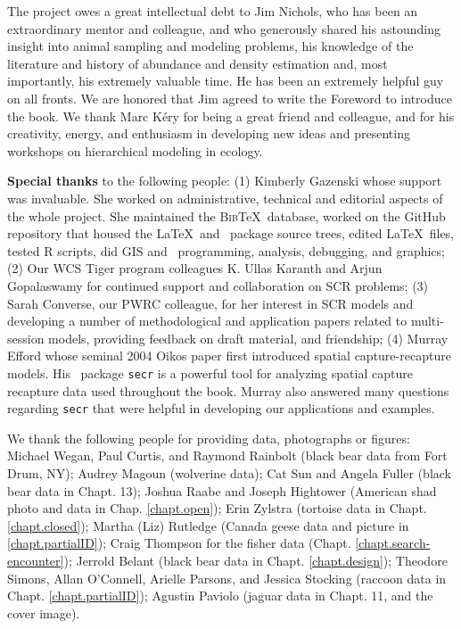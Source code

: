 
The project owes a great intellectual debt to Jim Nichols, who has
been an extraordinary mentor and colleague,
and who generously shared his
astounding insight into animal sampling and modeling problems, his
knowledge
of the literature and history of abundance and density estimation
and, most importantly, his extremely valuable time.
He has
been
an %
extremely helpful guy on all fronts. We are honored that Jim
agreed to write the Foreword to introduce the book. 
 We thank Marc K\'{e}ry
for being a great friend and colleague, and for his creativity, 
energy, and enthusiasm in developing new ideas and
presenting workshops on hierarchical modeling in ecology.

{\bf Special thanks} to the following people: (1) Kimberly Gazenski whose support was
invaluable. She worked on administrative, technical and editorial
aspects of the whole project. She maintained the \textsc{Bib}\TeX~database,
worked on the GitHub repository that housed the \LaTeX~and \R~package
source trees, edited \LaTeX~files, tested R scripts, did GIS and
\R~programming, analysis, debugging, and graphics;  (2) Our WCS Tiger
program colleagues K. Ullas Karanth and Arjun Gopalaswamy for
continued support and collaboration on SCR problems;  (3) Sarah
Converse, our PWRC colleague, for her interest in SCR models and
developing a number of methodological and application papers related
to multi-session models, providing feedback on draft material, and
friendship;  (4) Murray Efford whose seminal 2004 Oikos paper first introduced spatial
capture-recapture models.  His \R~package \mbox{\tt secr} 
is a powerful tool for analyzing
spatial capture recapture data used
throughout the book. Murray also answered many questions regarding \mbox{\tt secr} that 
were helpful in developing our applications and examples.

We thank the following people for providing data, photographs or figures:
Michael Wegan, Paul Curtis, and Raymond Rainbolt (black bear data from Fort Drum, NY);
Audrey Magoun (wolverine data); Cat Sun and Angela Fuller (black bear
data in Chapt. 13); Joshua Raabe and Joseph Hightower (American shad
photo and data in Chap. \ref{chapt.open}); Erin Zylstra (tortoise
data in Chapt. \ref{chapt.closed}); Martha (Liz) Rutledge (Canada geese
data and picture in \ref{chapt.partialID});  Craig Thompson for the
fisher data (Chapt. \ref{chapt.search-encounter});
Jerrold Belant (black bear data
in Chapt. \ref{chapt.design}); Theodore Simons, Allan O'Connell,
Arielle Parsons, and Jessica Stocking (raccoon data in Chapt.
\ref{chapt.partialID}); Agustin Paviolo (jaguar data in Chapt. 11, and
the cover image).

